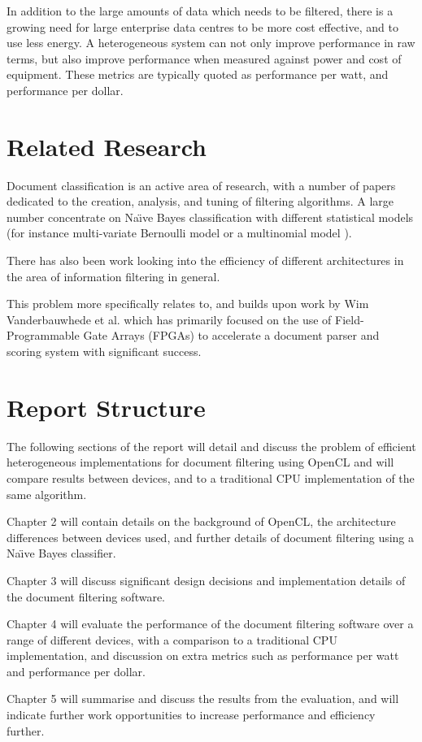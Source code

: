 In addition to the large amounts of data which needs to be filtered, there is a
growing need for large enterprise data centres to be more cost effective, and to
use less energy. A heterogeneous system can not only improve performance in raw
terms, but also improve performance when measured against power and cost of
equipment. These metrics are typically quoted as performance per watt, and
performance per dollar.

\section{Related Research}

Document classification is an active area of research, with a number of papers
dedicated to the creation, analysis, and tuning of filtering algorithms. A large
number concentrate on Na{\"{\i}}ve Bayes classification
\cite{androutsopoulos2000evaluation} \cite{androutsopoulos2000learning}  with
different statistical models (for instance multi-variate Bernoulli model or a
multinomial model \cite{Schneider:2003:CEM:1067807.1067848}
\cite{mccallum1998comparison}).

There has also been work looking into the efficiency of different architectures
in the area of information filtering \cite{chen2012invited}
\cite{he2013massively} in general.

This problem more specifically relates to, and builds upon work by Wim
Vanderbauwhede et al. which has primarily focused on the use of Field-
Programmable Gate Arrays (FPGAs) to accelerate a document parser and scoring
system \cite{vanderbauwhede2013high} \cite{HybridCPUFPGA}
\cite{chalamalasetti2012evaluating} with significant success.

\section{Report Structure}

The following sections of the report will detail and discuss the problem of
efficient heterogeneous implementations for document filtering using OpenCL and
will compare results between devices, and to a traditional CPU implementation of
the same algorithm.

Chapter 2 will contain details on the background of OpenCL, the architecture
differences between devices used, and further details of document filtering
using a Na{\"{\i}}ve Bayes classifier.

Chapter 3 will discuss significant design decisions and implementation details
of the document filtering software.

Chapter 4 will evaluate the performance of the document filtering software over
a range of different devices, with a comparison to a traditional CPU
implementation, and discussion on extra metrics such as performance per watt and
performance per dollar.

Chapter 5 will summarise and discuss the results from the evaluation, and will
indicate further work opportunities to increase performance and efficiency
further.
